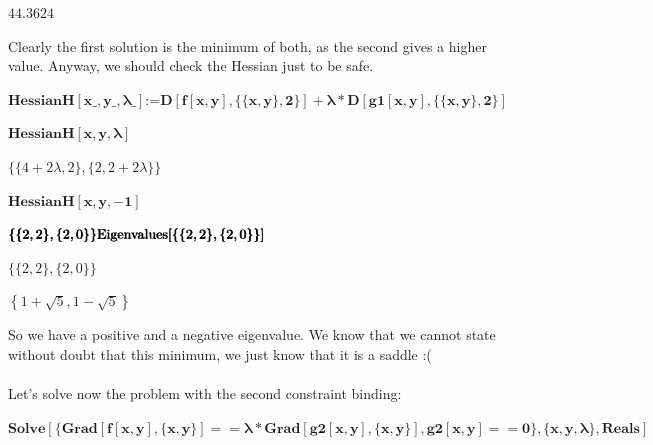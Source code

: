 \begin{doublespace}
\noindent\(44.3624\)
\end{doublespace}

Clearly the first solution is the minimum of both, as the second gives a higher value. Anyway, we should check the Hessian just to be safe.

\begin{doublespace}
\noindent\(\pmb{\text{HessianH}[\text{x$\_$},\text{y$\_$},\lambda \_] \text{:=} D[f[x,y],\{\{x,y\},2\}]+\lambda *D[\text{g1}[x,y],\{\{x,y\},2\}]}\)
\end{doublespace}

\begin{doublespace}
\noindent\(\pmb{\text{HessianH}[x,y,\lambda ]}\)
\end{doublespace}

\begin{doublespace}
\noindent\(\{\{4+2 \lambda ,2\},\{2,2+2 \lambda \}\}\)
\end{doublespace}

\begin{doublespace}
\noindent\(\pmb{\text{HessianH}[x,y,-1]}\)
\end{doublespace}

\begin{doublespace}
\noindent\(\pmb{\{\{2,2\},\{2,0\}\}}\\
\pmb{\text{Eigenvalues}[\{\{2,2\},\{2,0\}\}]}\)
\end{doublespace}

\begin{doublespace}
\noindent\(\{\{2,2\},\{2,0\}\}\)
\end{doublespace}

\begin{doublespace}
\noindent\(\left\{1+\sqrt{5},1-\sqrt{5}\right\}\)
\end{doublespace}

So we have a positive and a negative eigenvalue. We know that we cannot state without doubt that this minimum, we just know that it is a saddle :(\\
\\
Let{'}s solve now the problem with the second constraint binding:

\begin{doublespace}
\noindent\(\pmb{\text{Solve}[\{\text{Grad}[f[x,y],\{x,y\}]==\lambda *\text{Grad}[\text{g2}[x,y],\{x,y\}],\text{g2}[x,y]==0\},\{x,y,\lambda \},\text{Reals}]}\)
\end{doublespace}

